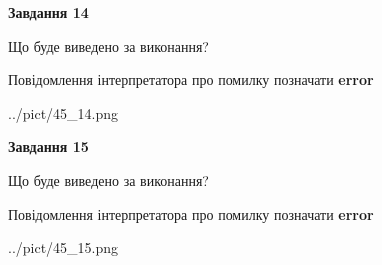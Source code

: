\documentclass[11pt, ukrainian]{article}
\begin{document}
{\begin {large}
{\begin {center}\textbf{Завдання 14}\end {center}}\par
Що буде виведено за виконання? \par
Повідомлення інтерпретатора про помилку позначати \textbf{error}

\begin{center}
	{../pict/45_14.png}
\end{center}
\newpage

{\begin {center}\textbf{Завдання 15}\end {center}}\par
Що буде виведено за виконання? \par
Повідомлення інтерпретатора про помилку позначати \textbf{error}

\begin{center}
	{../pict/45_15.png}
\end{center}
\newpage

\end {large}}
\end{document}
